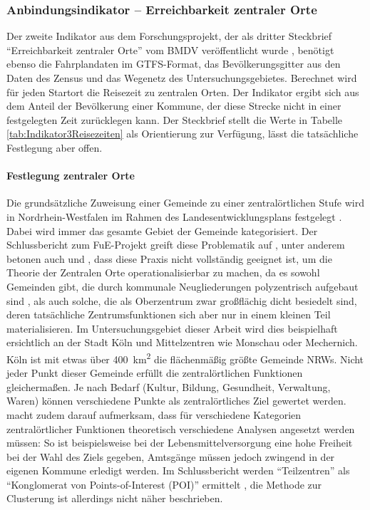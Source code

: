 \documentclass[11pt,pdftex,a4paper]{scrartcl}
\begin{document}
	\subsubsection{Anbindungsindikator -- Erreichbarkeit zentraler Orte}
	\label{sec:indicCentralPlace}
	Der zweite Indikator aus dem Forschungsprojekt, der als dritter Steckbrief \enquote{Erreichbarkeit zentraler Orte} vom BMDV veröffentlicht wurde \parencite[28--30]{bmdvIndikatorenLeichtGemacht2025}, benötigt ebenso die Fahrplandaten im GTFS-Format, das Bevölkerungsgitter aus den Daten des Zensus und das Wegenetz des Untersuchungsgebietes. Berechnet wird für jeden Startort die Reisezeit zu zentralen Orten. Der Indikator ergibt sich aus dem Anteil der Bevölkerung einer Kommune, der diese Strecke nicht in einer festgelegten Zeit zurücklegen kann. Der Steckbrief stellt die Werte in Tabelle \ref{tab:Indikator3Reisezeiten} als Orientierung zur Verfügung, lässt die tatsächliche Festlegung aber offen.
	
	\paragraph{Festlegung zentraler Orte}
	\label{par:determinecentralplaces}
	Die grundsätzliche Zuweisung einer Gemeinde zu einer zentralörtlichen Stufe wird in Nordrhein-Westfalen im Rahmen des Landesentwicklungsplans festgelegt \parencite[181--191]{MWIKENRWLandesentwicklungsplanNordrheinWestfalen2024}. Dabei wird immer das gesamte Gebiet der Gemeinde kategorisiert. Der Schlussbericht zum FuE-Projekt greift diese Problematik auf \parencite[64, 73]{kcwgmbhMethodikUndEmpfehlungen2024}, unter anderem betonen auch \textcite[140f]{Flex2016} und \textcite[90]{Terfrüchte2016}, dass diese Praxis nicht vollständig geeignet ist, um die Theorie der Zentralen Orte operationalisierbar zu machen, da es sowohl Gemeinden gibt, die durch kommunale Neugliederungen polyzentrisch aufgebaut sind \parencite[insbesondere Grund- und Mittelzentren, vgl. auch][16]{blotevogelZentraleOrteZur1996}, als auch solche, die als Oberzentrum zwar großflächig dicht besiedelt sind, deren tatsächliche Zentrumsfunktionen sich aber nur in einem kleinen Teil materialisieren. Im Untersuchungsgebiet dieser Arbeit wird dies beispielhaft ersichtlich an der Stadt Köln und Mittelzentren wie Monschau oder Mechernich. Köln ist mit etwas über \SI{400}{\kilo\metre\squared} die flächenmäßig größte Gemeinde NRWs. Nicht jeder Punkt dieser Gemeinde erfüllt die zentralörtlichen Funktionen gleichermaßen. Je nach Bedarf (Kultur, Bildung, Gesundheit, Verwaltung, Waren) können verschiedene Punkte als zentralörtliches Ziel gewertet werden. \textcite{Flex2016} macht zudem darauf aufmerksam, dass für verschiedene Kategorien zentralörtlicher Funktionen theoretisch verschiedene Analysen angesetzt werden müssen: So ist beispielsweise bei der Lebensmittelversorgung eine hohe Freiheit bei der Wahl des Ziels gegeben, Amtsgänge müssen jedoch zwingend in der eigenen Kommune erledigt werden. \parencite[149]{Flex2016} Im Schlussbericht werden \enquote{Teilzentren} als \enquote{Konglomerat von Points-of-Interest (POI)} ermittelt \parencite[74]{kcwgmbhMethodikUndEmpfehlungen2024}, die Methode zur Clusterung ist allerdings nicht näher beschrieben.
	
\end{document}
